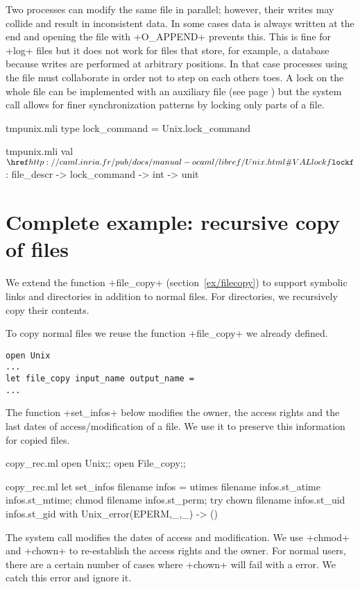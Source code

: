 Two processes can modify the same file in parallel; however, their
writes may collide and result in inconsistent data. In some cases data
is always written at the end and opening the file with \ml+O_APPEND+
prevents this. This is fine for \ml+log+ files but it does not
work for files that store, for example, a database because writes are
performed at arbitrary positions. In that case processes using the
file must collaborate in order not to step on each others toes.  A
lock on the whole file can be implemented with an auxiliary file (see
page \pageref{page/lock}) but the system call  allows
for finer synchronization patterns by locking only parts of a file.
%
\begin{codefile}{tmpunix.mli}
type lock_command = Unix.lock_command
\end{codefile}
%
\begin{listingcodefile}{tmpunix.mli}
 val $\libvalue{Unix}{lockf}$ : file_descr -> lock_command -> int -> unit
\end{listingcodefile}


\section{\label{sec/copyrec}Complete example: recursive copy of files}

We extend the function \ml+file_copy+ (section~\ref{ex/filecopy}) to
support symbolic links and directories in addition to normal files.
For directories, we recursively copy their contents.

To copy normal files we reuse the function \ml+file_copy+ we already
defined.
\begin{lstlisting}
open Unix
...
let file_copy input_name output_name =
...
\end{lstlisting}
The function \ml+set_infos+ below modifies the owner, the  
access rights and the last dates of access/modification
of a file. We use it to preserve this information for copied files.
%
\begin{codefile}{copy_rec.ml}
open Unix;;
open File_copy;;
\end{codefile}
%
\begin{listingcodefile}{copy_rec.ml}
let set_infos filename infos =
  utimes filename infos.st_atime infos.st_mtime;
  chmod filename infos.st_perm;
  try
    chown filename infos.st_uid infos.st_gid
  with Unix_error(EPERM,_,_) -> ()
\end{listingcodefile}
%
The system call  modifies the dates of access and 
modification.  We use \ml+chmod+ and \ml+chown+ to re-establish 
the access rights and the owner. For normal users, there are  
a certain number of cases where  \ml+chown+ will fail with a
 error. We catch this error and ignore it.

